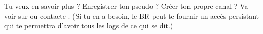  Tu veux en savoir plus ? Enregistrer ton pseudo ? Créer ton propre canal ? Va voir sur  ou contacte .
 (Si tu en a besoin, le BR peut te fournir un accés persistant qui te permettra d'avoir tous les logs de ce qui se dit.)

